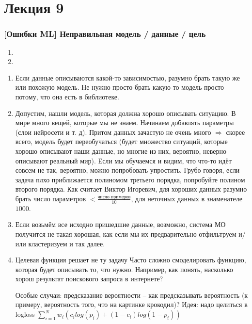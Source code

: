 \documentclass[main.tex]{subfiles}
\begin{document}
	
\section{Лекция 9}


\subsubsection{[Ошибки ML] Неправильная модель / данные / цель }

\begin{enumerate}[noitemsep]
	\item
	\item
\end{enumerate}	



\begin{enumerate}[noitemsep]
	\item Если данные описываются какой-то зависимостью, разумно брать такую же или похожую модель.
	Не нужно просто брать какую-то модель просто потому, что она есть в библиотеке.
	
	\item Допустим, нашли модель, которая должна хорошо описывать ситуацию.
	В мире много вещей, которые мы не знаем.
	Начинаем добавлять параметры (слои нейросети и т. д).
	Притом данных зачастую не очень много $ \Rightarrow $ скорее всего, модель будет переобучаться (будет множество ситуаций, которые хорошо описывают наши данные, но многие из них, вероятно, неверно описывают реальный мир).
	Если мы обучаемся и видим, что что-то идёт совсем не так, вероятно, можно попробовать упростить.
	Грубо говоря, если задача плхо приближается полиномом третьего порядка, попробуйте полином второго порядка.
	Как считает Виктор Игоревич, для хороших данных разумно брать число параметров $ < \frac{\text{число примеров}}{10} $,
	для неточных данных в знаменателе $ 1000 $.
	
	\item Если возьмём все исходно пришедшие данные, возможно, система МО получится не такая хорошая, как если мы их предварительно отфильтруем и/или кластеризуем и так далее.
	\item Целевая функция решает не ту задачу
	Часто сложно смоделировать функцию, которая будет описывать то, что нужно.
	Например, как понять, насколько хорош результат поискового запроса в интернете?
	
	Особые случаи: предсказание вероятности -- как предсказывать вероятность (к примеру, вероятность того, что на картинке крокодил)?
	Идея: надо целиться в logloss $ \sum_{i=1}^{N}w_i(c_i log(p_i) + (1-c_i)log(1 - p_i)) $
	

\end{enumerate}
\end{document}
